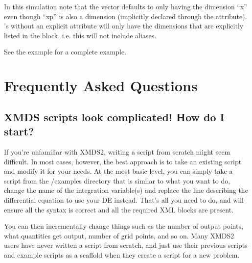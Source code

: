\documentclass[letterpaper,10pt,english]{sphinxmanual}
\begin{document}
\begin{sphinxVerbatim}[commandchars=\\\{\}]

\end{sphinxVerbatim}

\sphinxAtStartPar
In this simulation note that the vector  defaults to only having the dimension “x” even though “xp” is also a dimension (implicitly declared through the  attribute).  ’s without an explicit  attribute will only have the dimensions that are explicitly listed in the  block, i.e. this will not include aliases.

\sphinxAtStartPar
See the example  for a complete example.

\ignorespaces 

\chapter{Frequently Asked Questions}
\label{\detokenize{faq:frequently-asked-questions}}\label{\detokenize{faq:faq}}\label{\detokenize{faq:index-0}}\label{\detokenize{faq::doc}}

\section{XMDS scripts look complicated! How do I start?}
\label{\detokenize{faq:xmds-scripts-look-complicated-how-do-i-start}}
\sphinxAtStartPar
If you’re unfamiliar with XMDS2, writing a script from scratch might seem difficult. In most cases, however, the best approach is to take an existing script and modify it for your needs. At the most basic level, you can simply take a script from the /examples directory that is similar to what you want to do, change the name of the integration variable(s) and replace the line describing the differential equation to use your DE instead. That’s all you need to do, and will ensure all the syntax is correct and all the required XML blocks are present.

\sphinxAtStartPar
You can then incrementally change things such as the number of output points, what quantities get output, number of grid points, and so on. Many XMDS2 users have never written a script from scratch, and just use their previous scripts and example scripts as a scaffold when they create a script for a new problem.
\end{document}
